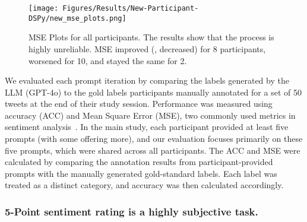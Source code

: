 \begin{figure*}[t]
    \centering
    \texttt{[image: Figures/Results/New-Participant-DSPy/new\_mse\_plots.png]}
    \caption{MSE Plots for all participants.
    The results show that the process is highly unreliable. 
MSE improved (\ie, decreased) for 8 participants, worsened for 10, and stayed the same for 2.}
    \label{fig:individual-pure-mse}
\end{figure*}




We evaluated each prompt iteration by comparing the labels generated by the LLM (GPT-4o) to the gold labels participants manually annotated for a set of 50 tweets at the end of their study session.
Performance was measured using accuracy (ACC) and Mean Square Error (MSE), two commonly used metrics in sentiment analysis~\cite{saxena2022introduction}.
In the main study, each participant provided at least five prompts (with some offering more), and our evaluation focuses primarily on these five prompts, which were shared across all participants.
The ACC and MSE were calculated by comparing the annotation results from participant-provided prompts with the manually generated gold-standard labels. Each label was treated as a distinct category, and accuracy was then calculated accordingly.

\subsubsection{5-Point sentiment rating is a highly subjective task.}

